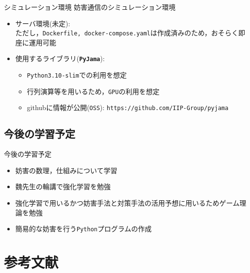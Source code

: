 \documentclass[11pt, aspectratio=169]{beamer}
\begin{document}
\begin{frame}{シミュレーション環境}
  妨害通信のシミュレーション環境
  \begin{itemize}
    \item サーバ環境(未定): \\
      ただし，\texttt{Dockerfile, docker-compose.yaml}は作成済みのため，おそらく即座に運用可能
    \item 使用するライブラリ(\textbf{\texttt{PyJama}}): 
      \begin{itemize}
        \item \texttt{Python3.10-slim}での利用を想定
        \item 行列演算等を用いるため，\texttt{GPU}の利用を想定
        \item githubに情報が公開(\texttt{OSS}): \texttt{https://github.com/IIP-Group/pyjama}
      \end{itemize}
  \end{itemize}
\end{frame}

\subsection{今後の学習予定}

\begin{frame}{今後の学習予定}
  \begin{itemize}
    \item 妨害の数理，仕組みについて学習
    \item 魏先生の輪講で強化学習を勉強
    \item 強化学習で用いるかつ妨害手法と対策手法の活用予想に用いるためゲーム理論を勉強

    \vspace{1em}

    \item 簡易的な妨害を行う\texttt{Python}プログラムの作成
  \end{itemize}
\end{frame}

\section{参考文献}
\end{document}
